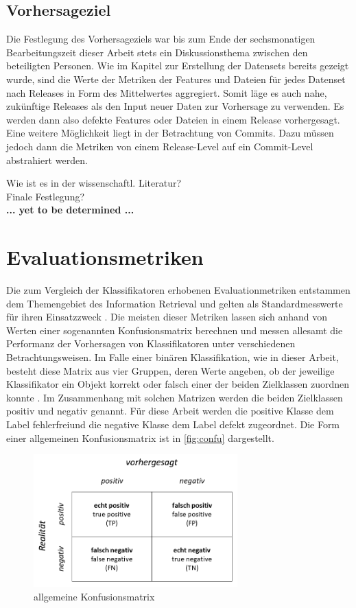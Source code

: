 \subsection*{Vorhersageziel}
Die Festlegung des Vorhersageziels war bis zum Ende der sechsmonatigen Bearbeitungszeit dieser Arbeit stets ein Diskussionsthema zwischen den beteiligten Personen. Wie im Kapitel zur Erstellung der Datensets bereits gezeigt wurde, sind die Werte der Metriken der Features und Dateien für jedes Datenset nach Releases in Form des Mittelwertes aggregiert. Somit läge es auch nahe, zukünftige Releases als den Input neuer Daten zur Vorhersage zu verwenden. Es werden dann also defekte Features oder Dateien in einem Release vorhergesagt. Eine weitere Möglichkeit liegt in der Betrachtung von Commits. Dazu müssen jedoch dann die Metriken von einem Release-Level auf ein Commit-Level abstrahiert werden.

Wie ist es in der wissenschaftl. Literatur? \\
Finale Festlegung? \\
\textbf{... yet to be determined ...}

\section{Evaluationsmetriken}
\label{eval-metrics}

Die zum Vergleich der Klassifikatoren erhobenen Evaluationmetriken entstammen dem Themengebiet des Information Retrieval und gelten als Standardmesswerte für ihren Einsatzzweck \cite{Sammut2017}. Die meisten dieser Metriken lassen sich anhand von Werten einer sogenannten Konfusionsmatrix berechnen und messen allesamt die Performanz der Vorhersagen von Klassifikatoren unter verschiedenen Betrachtungsweisen. Im Falle einer binären Klassifikation, wie in dieser Arbeit, besteht diese Matrix aus vier Gruppen, deren Werte angeben, ob der jeweilige Klassifikator ein Objekt korrekt oder falsch einer der beiden Zielklassen zuordnen konnte \cite{Sammut2017}. Im Zusammenhang mit solchen Matrizen werden die beiden Zielklassen \glqq positiv\grqq{} und \glqq negativ\grqq{} genannt. Für diese Arbeit werden die positive Klasse dem Label \glqq fehlerfrei\grqq und die negative Klasse dem Label \glqq defekt\grqq{} zugeordnet. Die Form einer allgemeinen Konfusionsmatrix ist in \autoref{fig:confu} dargestellt.

\begin{figure}[H]
    \centering
    \includegraphics[width=0.7\textwidth]{images/Confusion}
    \caption{allgemeine Konfusionsmatrix\label{fig:confu}}
\end{figure}

